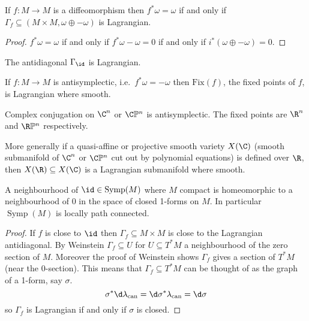 \documentclass[a4paper]{article}
\renewcommand*{\P}{\mathbb{P}}
\DeclareMathOperator{\Symp}{Symp}
\begin{document}
\begin{proposition}
  If \(f: M \to M\) is a diffeomorphism then \(f^*\omega = \omega\) if and only if \(\Gamma_f \subseteq (M \times M, \omega \oplus -\omega)\) is Lagrangian.
\end{proposition}

\begin{proof}
  \(f^*\omega = \omega\) if and only if \(f^*\omega - \omega = 0\) if and only if \(i^*(\omega \oplus -\omega) = 0\).
\end{proof}

\begin{eg}
  The antidiagonal \(\Gamma_{\id}\) is Lagrangian.
\end{eg}

\begin{proposition}
  If \(f: M \to M\) is antisymplectic, i.e.\ \(f^*\omega = - \omega\) then \(\mathrm{Fix}(f)\), the fixed points of \(f\), is Lagrangian where smooth.
\end{proposition}

\begin{eg}
  Complex conjugation on \(\C^n\) or \(\C\P^n\) is antisymplectic. The fixed points are \(\R^n\) and \(\R\P^n\) respectively.

  More generally if a quasi-affine or projective smooth variety \(X(\C)\) (smooth submanifold of \(\C^n\) or \(\C\P^n\) cut out by polynomial equations) is defined over \(\R\), then \(X(\R) \subseteq X(\C)\) is a Lagrangian submanifold where smooth.
\end{eg}

\begin{corollary}
  A neighbourhood of \(\id \in \Symp(M)\) where \(M\) compact is homeomorphic to a neighbourhood of \(0\) in the space of closed 1-forms on \(M\). In particular \(\Symp(M)\) is locally path connected.
\end{corollary}

\begin{proof}
  If \(f\) is close to \(\id\) then \(\Gamma_f \subseteq M \times M\) is close to the Lagrangian antidiagonal. By Weinstein \(\Gamma_f \subseteq U\) for \(U \subseteq T^*M\) a neighbourhood of the zero section of \(M\). Moreover the proof of Weinstein shows \(\Gamma_f\) gives a section of \(T^*M\) (near the \(0\)-section). This means that \(\Gamma_f \subseteq T^*M\) can be thought of as the graph of a 1-form, say \(\sigma\).
  \[
    \sigma^* \d \lambda_{\mathrm{can}} = \d \sigma^* \lambda_{\mathrm{can}} = \d \sigma
  \]
  so \(\Gamma_f\) is Lagrangian if and only if \(\sigma\) is closed.
\end{proof}
\end{document}
